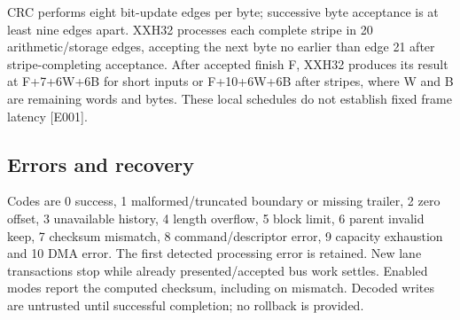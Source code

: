 \documentclass[11pt,a4paper]{article}
\begin{document}
CRC perf\allowbreak{}orms eigh\allowbreak{}t bit-upda\allowbreak{}te edge\allowbreak{}s per byte; succ\allowbreak{}essi\allowbreak{}ve byte acce\allowbreak{}ptan\allowbreak{}ce is at leas\allowbreak{}t nine edge\allowbreak{}s apar\allowbreak{}t. XXH3\allowbreak{}2 proc\allowbreak{}esse\allowbreak{}s each comp\allowbreak{}lete stri\allowbreak{}pe in 20 arit\allowbreak{}hmet\allowbreak{}ic/\allowbreak{}stor\allowbreak{}age edge\allowbreak{}s,\allowbreak{} acce\allowbreak{}ptin\allowbreak{}g the next byte no earl\allowbreak{}ier than edge 21 afte\allowbreak{}r stri\allowbreak{}pe-comp\allowbreak{}leti\allowbreak{}ng acce\allowbreak{}ptan\allowbreak{}ce. Afte\allowbreak{}r acce\allowbreak{}pted fini\allowbreak{}sh F,\allowbreak{} XXH3\allowbreak{}2 prod\allowbreak{}uces its resu\allowbreak{}lt at F+\allowbreak{}7+\allowbreak{}6W+\allowbreak{}6B for shor\allowbreak{}t inpu\allowbreak{}ts or F+\allowbreak{}10+\allowbreak{}6W+\allowbreak{}6B afte\allowbreak{}r stri\allowbreak{}pes,\allowbreak{} wher\allowbreak{}e W and B are rema\allowbreak{}inin\allowbreak{}g word\allowbreak{}s and byte\allowbreak{}s. Thes\allowbreak{}e loca\allowbreak{}l sche\allowbreak{}dule\allowbreak{}s do not esta\allowbreak{}blis\allowbreak{}h fixe\allowbreak{}d fram\allowbreak{}e late\allowbreak{}ncy [\allowbreak{}E001]\allowbreak{}.

\subsection{Erro\allowbreak{}rs and reco\allowbreak{}very}

Code\allowbreak{}s are 0 succ\allowbreak{}ess,\allowbreak{} 1 malf\allowbreak{}orme\allowbreak{}d/\allowbreak{}trun\allowbreak{}cate\allowbreak{}d boun\allowbreak{}dary or miss\allowbreak{}ing trai\allowbreak{}ler,\allowbreak{} 2 zero offs\allowbreak{}et,\allowbreak{} 3 unav\allowbreak{}aila\allowbreak{}ble hist\allowbreak{}ory,\allowbreak{} 4 leng\allowbreak{}th over\allowbreak{}flow,\allowbreak{} 5 bloc\allowbreak{}k limi\allowbreak{}t,\allowbreak{} 6 pare\allowbreak{}nt inva\allowbreak{}lid keep,\allowbreak{} 7 chec\allowbreak{}ksum mism\allowbreak{}atch,\allowbreak{} 8 comm\allowbreak{}and/\allowbreak{}desc\allowbreak{}ript\allowbreak{}or erro\allowbreak{}r,\allowbreak{} 9 capa\allowbreak{}city exha\allowbreak{}usti\allowbreak{}on and 10 DMA erro\allowbreak{}r. The firs\allowbreak{}t dete\allowbreak{}cted proc\allowbreak{}essi\allowbreak{}ng erro\allowbreak{}r is reta\allowbreak{}ined. New lane tran\allowbreak{}sact\allowbreak{}ions stop whil\allowbreak{}e alre\allowbreak{}ady pres\allowbreak{}ente\allowbreak{}d/\allowbreak{}acce\allowbreak{}pted bus work sett\allowbreak{}les. Enab\allowbreak{}led mode\allowbreak{}s repo\allowbreak{}rt the comp\allowbreak{}uted chec\allowbreak{}ksum,\allowbreak{} incl\allowbreak{}udin\allowbreak{}g on mism\allowbreak{}atch. Deco\allowbreak{}ded writ\allowbreak{}es are untr\allowbreak{}uste\allowbreak{}d unti\allowbreak{}l succ\allowbreak{}essf\allowbreak{}ul comp\allowbreak{}leti\allowbreak{}on; no roll\allowbreak{}back is prov\allowbreak{}ided.
\end{document}
